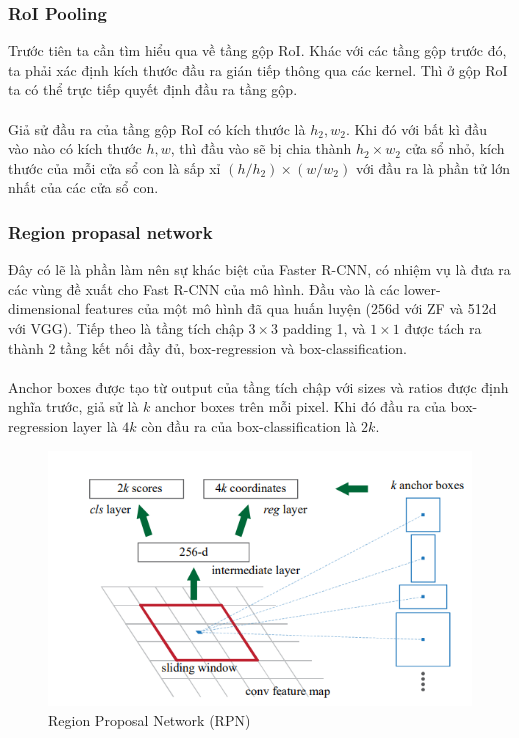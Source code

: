\documentclass{article}
\begin{document}
\subsubsection{RoI Pooling}
Trước tiên ta cần tìm hiểu qua về tầng gộp RoI. Khác với các tầng gộp trước đó, ta phải xác định kích thước đầu ra gián tiếp thông qua các kernel. Thì ở gộp RoI ta có thể trực tiếp quyết định đầu ra tầng gộp. \\\\
Giả sử đầu ra của tầng gộp RoI có kích thước là $h_2, w_2$. Khi đó với bất kì đầu vào nào có kích thước $h, w$, thì đầu vào sẽ bị chia thành $h_2\times w_2$ cửa sổ nhỏ, kích thước của mỗi cửa sổ con là sấp xỉ $(h/h_2)\times (w/w_2)$ với đầu ra là phần tử lớn nhất của các cửa sổ con.

\subsubsection{Region propasal network}
Đây có lẽ là phần làm nên sự khác biệt của Faster R-CNN, có nhiệm vụ là đưa ra các vùng đề xuất cho Fast R-CNN của mô hình. Đầu vào là các lower-dimensional features của một mô hình đã qua huấn luyện (256d với ZF và 512d với VGG). Tiếp theo là tầng tích chập $3\times3$ padding 1, và $1\times 1$ được tách ra thành 2 tầng kết nối đầy đủ, box-regression và box-classification. \\\\
Anchor boxes được tạo từ output của tầng tích chập với sizes và ratios được định nghĩa trước, giả sử là $k$ anchor boxes trên mỗi pixel. Khi đó đầu ra của box-regression layer là $4k$ còn đầu ra của box-classification là $2k$.
\begin{figure}[ht!]
    \centering
    \includegraphics[width = 0.7\linewidth]{rpn1.png}
    \caption{Region Proposal Network (RPN)}
    \label{fig7}
\end{figure}
\end{document}
